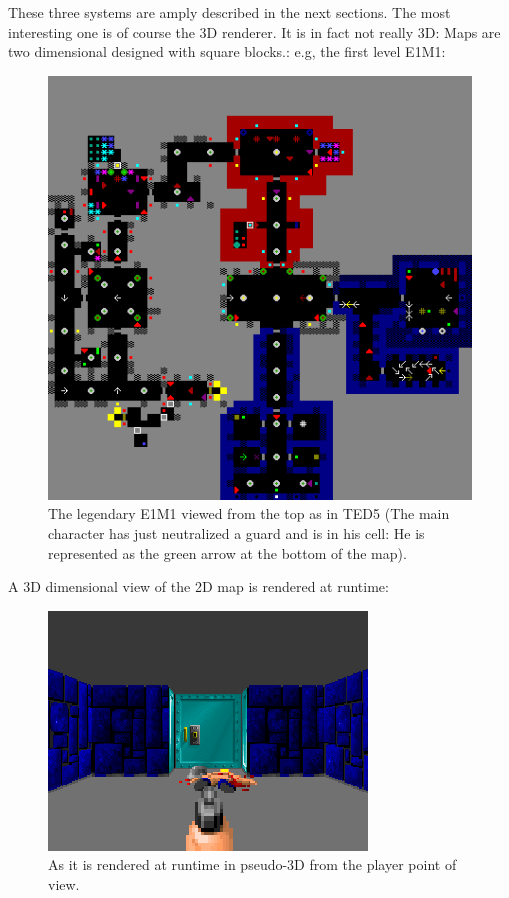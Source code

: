 \documentclass[book.tex]{subfiles}
\begin{document}
 
These three systems are amply described in the next sections. The most interesting one is of course the 3D renderer. It is in fact not really 3D: Maps are two dimensional designed with square blocks.: e.g, the first level E1M1:\par
\begin{figure}[H]
  \centering
 \includegraphics[width=\textwidth]{imgs/e1m1.png}
 \caption{The legendary E1M1 viewed from the top as in TED5 (The main character has just neutralized a guard and is in his cell: He is represented as the green arrow at the bottom of the map).}
\end{figure}
\par 
A 3D dimensional view of the 2D map is rendered at runtime:

\begin{figure}[H]
  \centering
 \includegraphics[width=\textwidth]{screenshots/wolf3d_7_fullframe.png}
 \caption{As it is rendered at runtime in pseudo-3D from the player point of view.} 
\end{figure}
\end{document}
